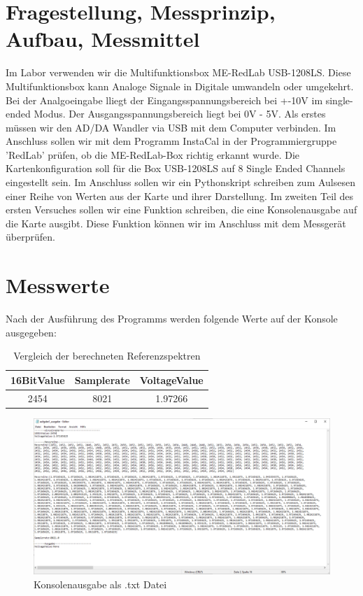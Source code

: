 \documentclass[12pt, oneside, a4paper, \docLanguage]{report}
\begin{document}
\section{Fragestellung, Messprinzip, Aufbau, Messmittel}
\label{chap:VERSUCH_1_FRAGESTELLUNG}

Im Labor verwenden wir die Multifunktionsbox ME-RedLab USB-1208LS. Diese Multifunktionsbox kann Analoge Signale in Digitale umwandeln oder umgekehrt.
\newline
Bei der Analgoeingabe lliegt der Eingangsspannungsbereich bei +-10V im single-ended Modus.
Der Ausgangsspannungsbereich liegt bei 0V - 5V.
\newline
\newline
Als erstes müssen wir den AD/DA Wandler via USB mit dem Computer verbinden.
Im Anschluss sollen wir mit dem Programm InstaCal in der Programmiergruppe 'RedLab' prüfen, ob die ME-RedLab-Box richtig erkannt wurde.
\newline
Die Kartenkonfiguration soll für die Box USB-1208LS auf 8 Single Ended Channels eingestellt sein.
\newline
\newline
Im Anschluss sollen wir ein Pythonskript schreiben zum Aulsesen einer Reihe von Werten aus der Karte und ihrer Darstellung.
\newline
Im zweiten Teil des ersten Versuches sollen wir eine Funktion schreiben, die eine Konsolenausgabe auf die Karte ausgibt.
Diese Funktion können wir im Anschluss mit dem Messgerät überprüfen.
\section{Messwerte}
\label{chap:VERSUCH_1_MESSWERTE}
Nach der Ausführung des Programms werden folgende Werte auf der Konsole ausgegeben:
\begin{table}[H]
	\centering\small
	\begin{tabular}{||c | c | c||}
		 \hline
		 16BitValue & Samplerate & VoltageValue \\ [0.5ex] 
		 \hline
		 2454 & 8021 & 1.97266  \\ 
		 \hline
	\end{tabular}
	\caption{Vergleich der berechneten Referenzspektren}
	\label{tab:tan}
\end{table}
\begin{figure}[hbt!]
	\centering
	\includegraphics[width=\linewidth]{media/values}
	\caption{Konsolenausgabe als .txt Datei}
	\label{img:values}
\end{figure}
\end{document}
